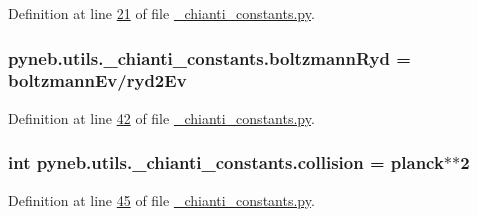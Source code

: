 Definition at line \hyperlink{__chianti__constants_8py_source_l00021}{21} of file \hyperlink{__chianti__constants_8py_source}{\+\_\+chianti\+\_\+constants.\+py}.

\hypertarget{namespacepyneb_1_1utils_1_1__chianti__constants_a5f93fd86cb8c071266138f93ee209d00}{}
\subsubsection[{boltzmann\+Ryd}]{\setlength{\rightskip}{0pt plus 5cm}pyneb.\+utils.\+\_\+chianti\+\_\+constants.\+boltzmann\+Ryd = {\bf boltzmann\+Ev}/{\bf ryd2\+Ev}}\label{namespacepyneb_1_1utils_1_1__chianti__constants_a5f93fd86cb8c071266138f93ee209d00}


Definition at line \hyperlink{__chianti__constants_8py_source_l00042}{42} of file \hyperlink{__chianti__constants_8py_source}{\+\_\+chianti\+\_\+constants.\+py}.

\hypertarget{namespacepyneb_1_1utils_1_1__chianti__constants_a66316d73d0acee3da0950278c48f8060}{}
\subsubsection[{collision}]{\setlength{\rightskip}{0pt plus 5cm}int pyneb.\+utils.\+\_\+chianti\+\_\+constants.\+collision = {\bf planck}$\ast$$\ast$2}\label{namespacepyneb_1_1utils_1_1__chianti__constants_a66316d73d0acee3da0950278c48f8060}


Definition at line \hyperlink{__chianti__constants_8py_source_l00045}{45} of file \hyperlink{__chianti__constants_8py_source}{\+\_\+chianti\+\_\+constants.\+py}.

\hypertarget{namespacepyneb_1_1utils_1_1__chianti__constants_ab3931b9eb84335e5e2051b39a17271ad}{}
